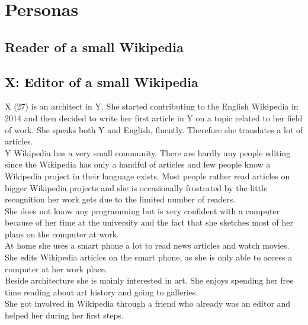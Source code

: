 \chapter{Personas}

\section{Reader of a small Wikipedia}

\section{X: Editor of a small Wikipedia}
X (27) is an architect in Y. She started contributing to the English Wikipedia in 2014 and then decided to write her first article in Y on a topic related to her field of work. She speaks both Y and English, fluently. Therefore she translates a lot of articles. \\
Y Wikipedia has a very small community. There are hardly any people editing since the Wikipedia has only a handful of articles and few people know a Wikipedia project in their language exists. Most people rather read articles on bigger Wikipedia projects and she is occasionally frustrated by the little recognition her work gets due to the limited number of readers. \\
She does not know any programming but is very confident with a computer because of her time at the university and the fact that she sketches most of her plans  on the computer at work. \\
At home she uses a smart phone a lot to read news articles and watch movies. She edits Wikipedia articles on the smart phone, as she is only able to access a computer at her work place. \\  
Beside architecture she is mainly interested in art. She enjoys spending her free time reading about art history and going to galleries. \\
She got involved in Wikipedia through a friend who already was an editor and helped her during her first steps.

